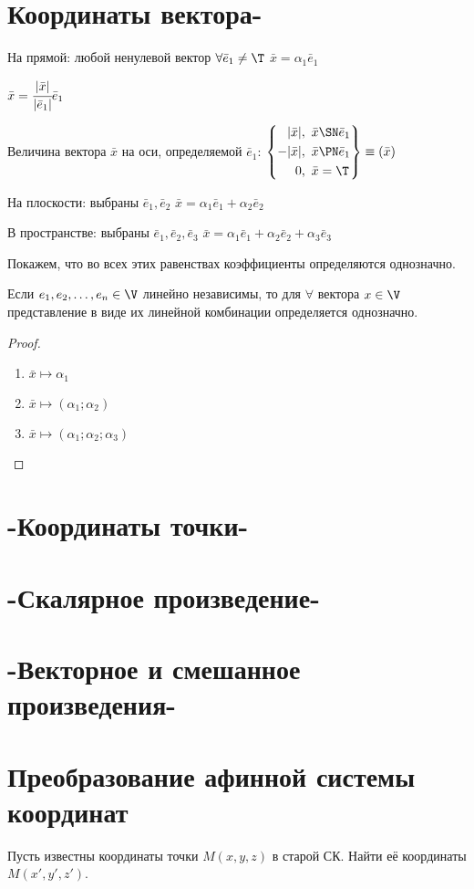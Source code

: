 \chapter{Координаты вектора-}
На  прямой: любой ненулевой вектор $\forall\bar{e}_1\neq\T$ \then $\bar{x}=\alpha_1\bar{e}_1$

$\bar{x}=\cfrac{|\bar{x}|}{|\bar{e}_1|}\bar{e}_1$

Величина вектора $\bar{x}$ на оси, определяемой $\bar{e}_1$:
$\left\{\begin{aligned}
 |\bar{x}| & ,\ \bar{x}\SN\bar{e}_1 \\
-|\bar{x}| & ,\ \bar{x}\PN\bar{e}_1 \\
         0 & ,\ \bar{x}=\T
\end{aligned}\right\}\equiv(\bar{x})$

На плоскости: выбраны $\bar{e}_1,\bar{e}_2$ \then $\bar{x}=\alpha_1\bar{e}_1+\alpha_2\bar{e}_2$

В пространстве: выбраны $\bar{e}_1,\bar{e}_2,\bar{e}_3$ \then $\bar{x}=\alpha_1\bar{e}_1+\alpha_2\bar{e}_2+\alpha_3\bar{e}_3$

Покажем, что во всех этих равенствах коэффициенты определяются однозначно.
\begin{theor}
Если $e_1,e_2,\ldots,e_n\in\V$ линейно независимы, то для $\forall$ вектора $x\in\V$ представление в виде их линейной комбинации определяется однозначно.
\end{theor}
\begin{proof}
\begin{enumerate}
\item $\bar{x}\mapsto\alpha_1$
\item $\bar{x}\mapsto(\alpha_1;\alpha_2)$
\item $\bar{x}\mapsto(\alpha_1;\alpha_2;\alpha_3)$
\end{enumerate}	
\end{proof}
\chapter{-Координаты точки-}	
\chapter{-Скалярное произведение-}
\chapter{-Векторное и смешанное произведения-}
\chapter{Преобразование афинной системы координат}
Пусть известны координаты точки $M(x,y,z)$ в старой СК. Найти её координаты $M(x',y',z')$.

